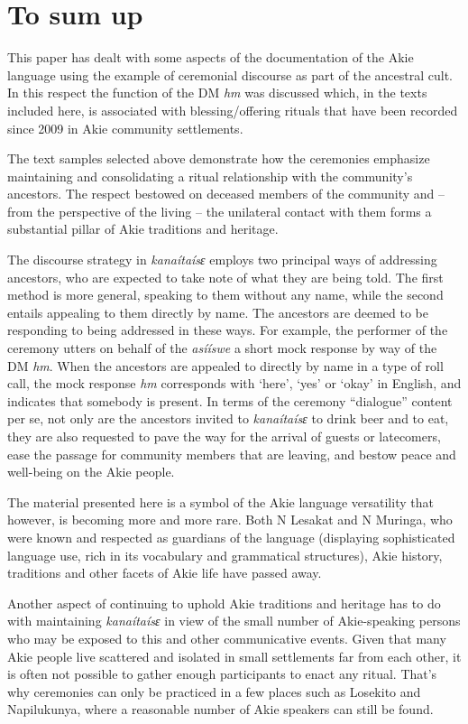 \documentclass[output=paper,colorlinks,citecolor=brown]{langscibook}
\begin{document}
\section{To sum up}\label{sec:legere:5}

This paper has dealt with some aspects of the documentation of the Akie language using the example of ceremonial discourse as part of the ancestral cult.  In this respect the function of the DM \textit{hm} was discussed which, in the texts included here, is associated with blessing/offering rituals that have been recorded since 2009 in Akie community settlements. 

The text samples selected above demonstrate how the ceremonies emphasize maintaining and consolidating a ritual relationship with the community’s ancestors. The respect bestowed on deceased members of the community and – from the perspective of the living – the unilateral contact with them forms a substantial pillar of Akie traditions and heritage.

The discourse strategy in \textit{kanaítaísɛ} employs two principal ways of addressing ancestors, who are expected to take note of what they are being told. The first method is more general, speaking to them without any name, while the second entails appealing to them directly by name. The ancestors are deemed to be responding to being addressed in these ways. For example, the performer of the ceremony utters on behalf of the \textit{asííswe} a short mock response by way of the DM \textit{hm}. When the ancestors are appealed to directly by name in a type of roll call, the mock response \textit{hm} corresponds with ‘here’, ‘yes’ or ‘okay’ in English, and indicates that somebody is present. In terms of the ceremony “dialogue” content per se, not only are the ancestors invited to \textit{kanaítaísɛ} to drink beer and to eat, they are also requested to pave the way for the arrival of guests or latecomers, ease the passage for community members that are leaving, and bestow peace and well-being on the Akie people.

The material presented here is a symbol of the Akie language versatility that however, is becoming more and more rare. Both N Lesakat and N Muringa, who were known and respected as guardians of the language (displaying sophisticated language use, rich in its vocabulary and grammatical structures), Akie history, traditions and other facets of Akie life  have passed away. 

Another aspect of continuing to uphold Akie traditions and heritage has to do with maintaining \textit{kanaítaísɛ} in view of the small number of Akie-speaking persons who may be exposed to this and other communicative events. Given that many Akie people live scattered and isolated in small settlements far from each other, it is often not possible to gather enough participants to enact any ritual. That’s why ceremonies can only be practiced in a few places such as Losekito and Napilukunya, where a reasonable number of Akie speakers can still be found.
\end{document}
